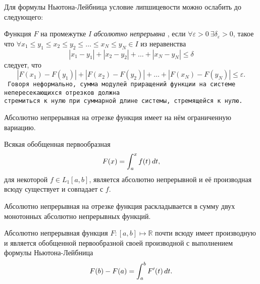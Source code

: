 Для формулы Ньютона-Лейбница условие липшицевости можно ослабить до следующего:

\begin{to_def}
    Функция $F$ на промежутке $I$ \textit{абсолютно непрерывна} , если $\forall \varepsilon > 0 \ \exists \delta_\varepsilon > 0$, такое что
    $\forall x_1 \leq y_1 \leq x_2 \leq y_2 \leq \ldots \leq x_N \leq y_N \in I$ из неравенства
    \begin{equation*}
        |x_1 - y_1| + |x_2 - y_2| + \ldots + |x_N - y_N| \leq \delta
    \end{equation*}
    следует, что
    \begin{equation*}
        |F(x_1)-F(y_1)| + 
        |F(x_2)-F(y_2)| + 
        \ldots +
        |F(x_N)-F(y_N)| \leq \varepsilon.
    \end{equation*}
    \texttt{
    Говоря неформально, сумма модулей приращений функции на системе непересекающихся отрезков должна \\ стремиться к нулю при суммарной длине системы, стремящейся к нулю.
    } 
\end{to_def}

\begin{to_lem}
    Абсолютно непрерывная на отрезке функция имеет на нём ограниченную вариацию.
\end{to_lem}


\begin{to_thr}[]
    Всякая обобщенная первообразная 
    \begin{equation*}
        F(x) = \int_a^x f(t) \, d t,
    \end{equation*}
    для некоторой $f \in L_1 [a, b]$, является абсолютно непрерывной и её производная всюду существует и совпадает с $f$.
\end{to_thr}


\begin{to_lem}
    Абсолютно непрерывная на отрезке функция раскладывается в сумму двух монотонных абсолютно непрерывных функций.
\end{to_lem}


\begin{to_thr}[]
    Абсолютно непрерывная функция $F \colon [a, b] \mapsto \mathbb{R}$ почти всюду имеет производную и является обобщенной первообразной своей производной с выполнением формулы Ньютона-Лейбница
    \begin{equation*}
        F(b) - F(a) = \int_a^b F' (t) \, d t.
    \end{equation*}
\end{to_thr}

